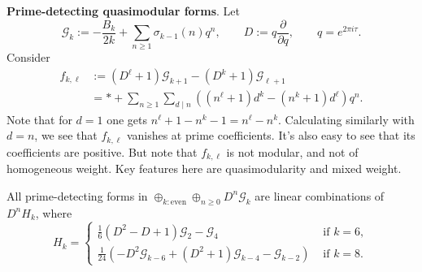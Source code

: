 \documentclass[reqno]{amsart} 
\begin{document}
\textbf{Prime-detecting quasimodular forms}.  Let
\begin{equation*}
  \mathcal{G}_k := - \frac{B_k}{2 k} + \sum_{n \geq  1} \sigma_{k - 1}(n) q^n,
  \qquad
  D := q \frac{\partial}{\partial q},
  \qquad q = e^{2 \pi i \tau}.  
\end{equation*}
Consider
\begin{align*}
  f_{k, \ell} &:=(D^{\ell} + 1) \mathcal{G}_{k + 1} -(D^k + 1) \mathcal{G}_{\ell + 1} \\
              &= \ast + \sum_{n \geq 1} \sum_{d \mid n} \left((n^{\ell} + 1) d^k -(n^k + 1) d^{\ell} \right) q^n.
\end{align*}
Note that for $d = 1$ one gets $n^{\ell} + 1 - n^k - 1 = n^{\ell} - n^k$.  Calculating similarly with $d = n$, we see that $f_{k, \ell}$ vanishes at prime coefficients.  It's also easy to see that its coefficients are positive.  But note that $f_{k, \ell}$ is not modular, and not of homogeneous weight.  Key features here are quasimodularity and mixed weight.

\begin{theorem} All prime-detecting forms in $\oplus_{k: \text{even}} \oplus_{n \geq 0} D^n \mathcal{G}_k$ are linear combinations of $D^n H_{k}$, where
  \begin{equation*}
    H_k =
    \begin{cases}
      \frac{1}{6}(D^2 - D + 1) \mathcal{G}_2 - \mathcal{G}_4      &  \text{ if } k = 6, \\
      \frac{1}{24} \left( - D^2 \mathcal{G}_{k - 6} +(D^2 + 1) \mathcal{G}_{k - 4} - \mathcal{G}_{k - 2} \right)                                                                  & \text{ if } k = 8.
    \end{cases}
  \end{equation*}
\end{theorem}
\end{document}

